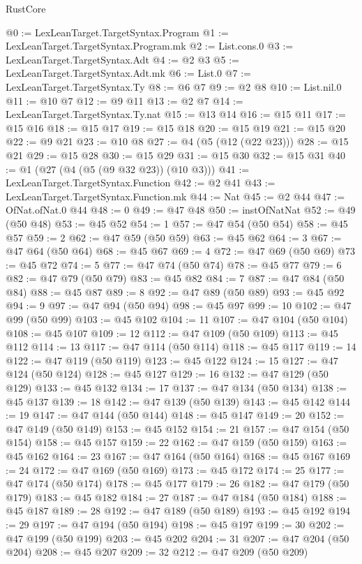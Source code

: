 \begin{lexlean}{RustCore}
\begin{coremodule}
@0 := LexLeanTarget.TargetSyntax.Program
@1 := LexLeanTarget.TargetSyntax.Program.mk
@2 := List.cons.{0}
@3 := LexLeanTarget.TargetSyntax.Adt
@4 := @2 @3
@5 := LexLeanTarget.TargetSyntax.Adt.mk
@6 := List.{0}
@7 := LexLeanTarget.TargetSyntax.Ty
@8 := @6 @7
@9 := @2 @8
@10 := List.nil.{0}
@11 := @10 @7
@12 := @9 @11
@13 := @2 @7
@14 := LexLeanTarget.TargetSyntax.Ty.nat
@15 := @13 @14
@16 := @15 @11
@17 := @15 @16
@18 := @15 @17
@19 := @15 @18
@20 := @15 @19
@21 := @15 @20
@22 := @9 @21
@23 := @10 @8
@27 := @4 (@5 (@12 (@22 @23)))
@28 := @15 @21
@29 := @15 @28
@30 := @15 @29
@31 := @15 @30
@32 := @15 @31
@40 := @1 (@27 (@4 (@5 (@9 @32 @23)) (@10 @3)))
@41 := LexLeanTarget.TargetSyntax.Function
@42 := @2 @41
@43 := LexLeanTarget.TargetSyntax.Function.mk
@44 := Nat
@45 := @2 @44
@47 := OfNat.ofNat.{0} @44
@48 := 0
@49 := @47 @48
@50 := instOfNatNat
@52 := @49 (@50 @48)
@53 := @45 @52
@54 := 1
@57 := @47 @54 (@50 @54)
@58 := @45 @57
@59 := 2
@62 := @47 @59 (@50 @59)
@63 := @45 @62
@64 := 3
@67 := @47 @64 (@50 @64)
@68 := @45 @67
@69 := 4
@72 := @47 @69 (@50 @69)
@73 := @45 @72
@74 := 5
@77 := @47 @74 (@50 @74)
@78 := @45 @77
@79 := 6
@82 := @47 @79 (@50 @79)
@83 := @45 @82
@84 := 7
@87 := @47 @84 (@50 @84)
@88 := @45 @87
@89 := 8
@92 := @47 @89 (@50 @89)
@93 := @45 @92
@94 := 9
@97 := @47 @94 (@50 @94)
@98 := @45 @97
@99 := 10
@102 := @47 @99 (@50 @99)
@103 := @45 @102
@104 := 11
@107 := @47 @104 (@50 @104)
@108 := @45 @107
@109 := 12
@112 := @47 @109 (@50 @109)
@113 := @45 @112
@114 := 13
@117 := @47 @114 (@50 @114)
@118 := @45 @117
@119 := 14
@122 := @47 @119 (@50 @119)
@123 := @45 @122
@124 := 15
@127 := @47 @124 (@50 @124)
@128 := @45 @127
@129 := 16
@132 := @47 @129 (@50 @129)
@133 := @45 @132
@134 := 17
@137 := @47 @134 (@50 @134)
@138 := @45 @137
@139 := 18
@142 := @47 @139 (@50 @139)
@143 := @45 @142
@144 := 19
@147 := @47 @144 (@50 @144)
@148 := @45 @147
@149 := 20
@152 := @47 @149 (@50 @149)
@153 := @45 @152
@154 := 21
@157 := @47 @154 (@50 @154)
@158 := @45 @157
@159 := 22
@162 := @47 @159 (@50 @159)
@163 := @45 @162
@164 := 23
@167 := @47 @164 (@50 @164)
@168 := @45 @167
@169 := 24
@172 := @47 @169 (@50 @169)
@173 := @45 @172
@174 := 25
@177 := @47 @174 (@50 @174)
@178 := @45 @177
@179 := 26
@182 := @47 @179 (@50 @179)
@183 := @45 @182
@184 := 27
@187 := @47 @184 (@50 @184)
@188 := @45 @187
@189 := 28
@192 := @47 @189 (@50 @189)
@193 := @45 @192
@194 := 29
@197 := @47 @194 (@50 @194)
@198 := @45 @197
@199 := 30
@202 := @47 @199 (@50 @199)
@203 := @45 @202
@204 := 31
@207 := @47 @204 (@50 @204)
@208 := @45 @207
@209 := 32
@212 := @47 @209 (@50 @209)

\end{coremodule}
\end{lexlean}

